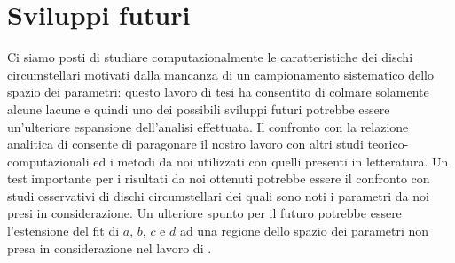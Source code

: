 \section{Sviluppi futuri}

Ci siamo posti di studiare computazionalmente le caratteristiche dei dischi circumstellari motivati dalla mancanza di un campionamento sistematico dello spazio dei parametri: questo lavoro di tesi ha consentito di colmare solamente alcune lacune e quindi uno dei possibili sviluppi futuri potrebbe essere un'ulteriore espansione dell'analisi effettuata.
Il confronto con la relazione analitica di \textcite{ManaraTronc2019} consente di paragonare il nostro lavoro con altri studi teorico-computazionali ed i metodi da noi utilizzati con quelli presenti in letteratura.
Un test importante per i risultati da noi ottenuti potrebbe essere il confronto con studi osservativi di dischi circumstellari dei quali sono noti i parametri da noi presi in considerazione.
Un ulteriore spunto per il futuro potrebbe essere l'estensione del fit di $a$, $b$, $c$ e $d$ ad una regione dello spazio dei parametri non presa in considerazione nel lavoro di \textcite{ManaraTronc2019}.

